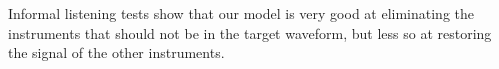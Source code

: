 \documentclass[twocolumn,superscriptaddress,aps]{revtex4-1}
\begin{document}
Informal listening tests show that our model is very good at eliminating the instruments that should not be in the target waveform, but less so at restoring the signal of the other instruments.






\end{document}
